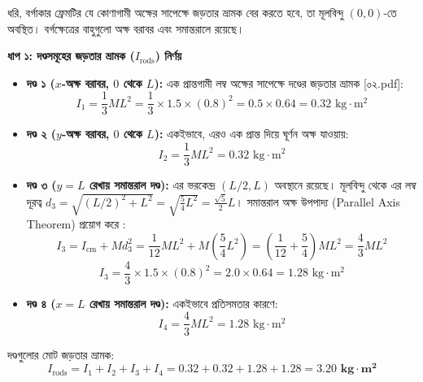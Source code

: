 \documentclass[12pt, a4paper]{article}
\begin{document}
\begin{tcolorbox}[solutionbox={সমাধান (Solution)}]
\noindent
ধরি, বর্গাকার ফ্রেমটির যে কোণাগামী অক্ষের সাপেক্ষে জড়তার ভ্রামক বের করতে হবে, তা মূলবিন্দু $(0,0)$-তে অবস্থিত। বর্গক্ষেত্রের বাহুগুলো অক্ষ বরাবর এবং সমান্তরালে রয়েছে।

\vspace{0.5em}
\noindent
\textbf{ধাপ ১: দণ্ডসমূহের জড়তার ভ্রামক ($I_{\text{rods}}$) নির্ণয়} \\
\begin{itemize}[leftmargin=*, parsep=0.4ex]
    \item \textbf{দণ্ড ১ ($x$-অক্ষ বরাবর, $0$ থেকে $L$):} এক প্রান্তগামী লম্ব অক্ষের সাপেক্ষে দণ্ডের জড়তার ভ্রামক [০২.pdf]:
    $$I_1 = \frac{1}{3} M L^2 = \frac{1}{3} \times 1.5 \times (0.8)^2 = 0.5 \times 0.64 = 0.32\text{ kg}\cdot\text{m}^2$$
    \item \textbf{দণ্ড ২ ($y$-অক্ষ বরাবর, $0$ থেকে $L$):} একইভাবে, এরও এক প্রান্ত দিয়ে ঘূর্ণন অক্ষ যাওয়ায়:
    $$I_2 = \frac{1}{3} M L^2 = 0.32\text{ kg}\cdot\text{m}^2$$
    \item \textbf{দণ্ড ৩ ($y = L$ রেখায় সমান্তরাল দণ্ড):} এর ভরকেন্দ্র $(L/2, L)$ অবস্থানে রয়েছে। মূলবিন্দু থেকে এর লম্ব দূরত্ব $d_3 = \sqrt{(L/2)^2 + L^2} = \sqrt{\frac{5}{4}L^2} = \frac{\sqrt{5}}{2} L$। সমান্তরাল অক্ষ উপপাদ্য (Parallel Axis Theorem) প্রয়োগ করে :
    $$I_3 = I_{\text{cm}} + M d_3^2 = \frac{1}{12} M L^2 + M \left(\frac{5}{4} L^2\right) = \left(\frac{1}{12} + \frac{5}{4}\right) M L^2 = \frac{4}{3} M L^2$$
    $$I_3 = \frac{4}{3} \times 1.5 \times (0.8)^2 = 2.0 \times 0.64 = 1.28\text{ kg}\cdot\text{m}^2$$
    \item \textbf{দণ্ড ৪ ($x = L$ রেখায় সমান্তরাল দণ্ড):} একইভাবে প্রতিসমতার কারণে:
    $$I_4 = \frac{4}{3} M L^2 = 1.28\text{ kg}\cdot\text{m}^2$$
\end{itemize}

দণ্ডগুলোর মোট জড়তার ভ্রামক:
$$I_{\text{rods}} = I_1 + I_2 + I_3 + I_4 = 0.32 + 0.32 + 1.28 + 1.28 = \mathbf{3.20\text{ kg}\cdot\text{m}^2}$$

\vspace{1em}
\begin{center}
\begin{tikzpicture}[>=Stealth, scale=1.1, text=black]


\end{tikzpicture}
\end{center}
\end{tcolorbox}
\end{document}
